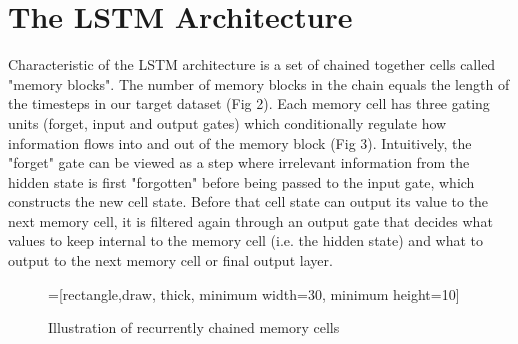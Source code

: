 \documentclass[journal]{IEEEtran}
\begin{document}
\section{The LSTM Architecture}
Characteristic of the LSTM architecture is a set of chained together cells called "memory blocks". The number
of memory blocks in the chain equals the length of the timesteps in our target dataset (Fig 2).
Each memory cell has three gating units (forget, input and output gates) which
conditionally regulate how information flows into and out of the memory block (Fig 3). Intuitively,
the "forget" gate can be viewed as a step where irrelevant information from the hidden state
is first "forgotten" before being passed to the input gate, which constructs the new cell state.
Before that cell state can output its value to the next memory cell, it is filtered again through
an output gate that decides what values to keep internal to the memory cell (i.e. the hidden state)
and what to output to the next memory cell or final output layer.

\begin{figure}[h]
\centering
{}=[rectangle,draw, thick, minimum width=30, minimum height=10]
\caption{Illustration of recurrently chained memory cells}
\end{figure}

\end{document}
